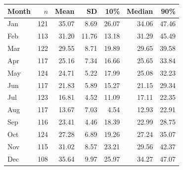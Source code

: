 \begin{tabular}{@{}lrrrrrr@{}}
\toprule
Month & $n$ & Mean & SD & 10\% & Median & 90\% \\
\midrule
Jan & 121 & 35.07 & 8.69 & 26.07 & 34.06 & 47.46 \\
Feb & 113 & 31.20 & 11.76 & 13.18 & 31.29 & 45.49 \\
Mar & 122 & 29.55 & 8.71 & 19.89 & 29.65 & 39.58 \\
Apr & 117 & 25.16 & 7.34 & 16.66 & 25.65 & 33.84 \\
May & 124 & 24.71 & 5.22 & 17.99 & 25.08 & 32.23 \\
Jun & 117 & 21.83 & 5.89 & 15.27 & 21.15 & 29.34 \\
Jul & 123 & 16.81 & 4.52 & 11.09 & 17.11 & 22.35 \\
Aug & 117 & 13.67 & 7.03 & 4.54 & 12.93 & 22.91 \\
Sep & 116 & 23.41 & 4.46 & 18.39 & 22.99 & 28.75 \\
Oct & 124 & 27.28 & 6.89 & 19.26 & 27.24 & 35.07 \\
Nov & 115 & 31.02 & 8.57 & 23.21 & 29.56 & 42.37 \\
Dec & 108 & 35.64 & 9.97 & 25.97 & 34.27 & 47.07 \\
\bottomrule
\end{tabular}
